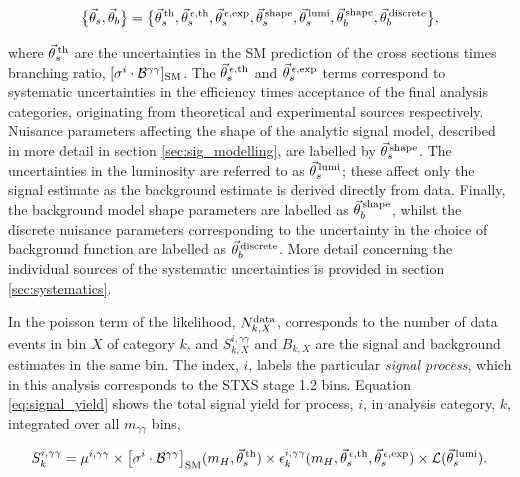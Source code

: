 \begin{equation}\label{eq:systematics_grouping}
    \big\{\vec{\theta}_s,\vec{\theta}_b\big\} = \big\{ \vec{\theta}^{\,\rm{th}}_{s}, \vec{\theta}^{\,\epsilon,{\rm{th}}}_{s}, \vec{\theta}^{\,\epsilon,{\rm{exp}}}_{s}, \vec{\theta}^{\,\rm{shape}}_{s}, \vec{\theta}^{\,\rm{lumi}}_{s}, \vec{\theta}^{\,\rm{shape}}_{b}, \vec{\theta}^{\,\rm{discrete}}_{b}  \big\},
\end{equation}

\noindent
where $\vec{\theta}^{\,\rm{th}}_{s}$ are the uncertainties in the SM prediction of the cross sections times branching ratio, $[\sigma^i \cdot \mathcal{B}^{\gamma\gamma}]_{\rm{SM}}$. The $\vec{\theta}^{\,\epsilon,{\rm{th}}}_{s}$ and $\vec{\theta}^{\,\epsilon,{\rm{exp}}}_{s}$ terms correspond to systematic uncertainties in the efficiency times acceptance of the final analysis categories, originating from theoretical and experimental sources respectively. Nuisance parameters affecting the shape of the analytic signal model, described in more detail in section \ref{sec:sig_modelling}, are labelled by $\vec{\theta}^{\,\rm{shape}}_{s}$. The uncertainties in the luminosity are referred to as $\vec{\theta}^{\,\rm{lumi}}_{s}$; these affect only the signal estimate as the background estimate is derived directly from data. Finally, the background model shape parameters are labelled as $\vec{\theta}^{\,\rm{shape}}_{b}$, whilst the discrete nuisance parameters corresponding to the uncertainty in the choice of background function are labelled as $\vec{\theta}^{\,\rm{discrete}}_{b}$. More detail concerning the individual sources of the systematic uncertainties is provided in section \ref{sec:systematics}.

In the poisson term of the likelihood, $N_{k,X}^{\rm{data}}$, corresponds to the number of data events in bin $X$ of category $k$, and $S_{k,X}^{i,\gamma\gamma}$ and $B_{k,X}$ are the signal and background estimates in the same bin. The index, $i$, labels the particular \textit{signal process}, which in this analysis corresponds to the STXS stage 1.2 bins. Equation \ref{eq:signal_yield} shows the total signal yield for process, $i$, in analysis category, $k$, integrated over all $m_{\gamma\gamma}$ bins,

\begin{equation}\label{eq:signal_yield}
    S_k^{i,\gamma\gamma} = \mu^{i,\gamma\gamma} \times \big[\sigma^i \cdot \mathcal{B}^{\gamma\gamma} \big]_{\rm{SM}}(m_H,\vec{\theta}^{\,\rm{th}}_{s}) \times \epsilon^{i,\gamma\gamma}_k(m_H,\vec{\theta}^{\,\epsilon,{\rm{th}}}_{s}, \vec{\theta}^{\,\epsilon,{\rm{exp}}}_{s}) \times \mathcal{L}(\vec{\theta}^{\,\rm{lumi}}_{s}).
\end{equation}

